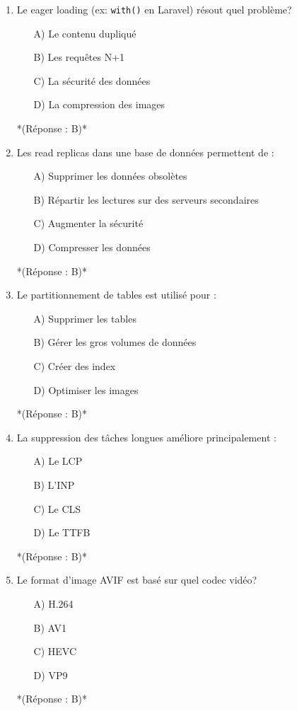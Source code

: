 \documentclass[12pt,a4paper,twoside]{report}
\begin{document}
\begin{enumerate}
\item Le eager loading (ex: \texttt{with()} en Laravel) résout quel problème?
\begin{itemize}
\item[A)] Le contenu dupliqué
\item[B)] Les requêtes N+1
\item[C)] La sécurité des données
\item[D)] La compression des images
\end{itemize}
*(Réponse : B)*

\item Les read replicas dans une base de données permettent de :
\begin{itemize}
\item[A)] Supprimer les données obsolètes
\item[B)] Répartir les lectures sur des serveurs secondaires
\item[C)] Augmenter la sécurité
\item[D)] Compresser les données
\end{itemize}
*(Réponse : B)*

\item Le partitionnement de tables est utilisé pour :
\begin{itemize}
\item[A)] Supprimer les tables
\item[B)] Gérer les gros volumes de données
\item[C)] Créer des index
\item[D)] Optimiser les images
\end{itemize}
*(Réponse : B)*

\item La suppression des tâches longues améliore principalement :
\begin{itemize}
\item[A)] Le LCP
\item[B)] L'INP
\item[C)] Le CLS
\item[D)] Le TTFB
\end{itemize}
*(Réponse : B)*

\item Le format d'image AVIF est basé sur quel codec vidéo?
\begin{itemize}
\item[A)] H.264
\item[B)] AV1
\item[C)] HEVC
\item[D)] VP9
\end{itemize}
*(Réponse : B)*


\end{enumerate}
\end{document}
